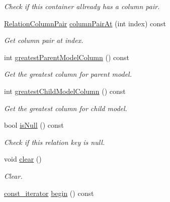 \begin{DoxyCompactItemize}
\begin{DoxyCompactList}\small\item\em Check if this container allready has a column pair. \end{DoxyCompactList}\item 
\hyperlink{class_mdt_1_1_item_model_1_1_relation_column_pair}{Relation\+Column\+Pair} \hyperlink{class_mdt_1_1_item_model_1_1_relation_key_aed3ebac01e8969d0e23df593a96d3486}{column\+Pair\+At} (int index) const 
\begin{DoxyCompactList}\small\item\em Get column pair at index. \end{DoxyCompactList}\item 
int \hyperlink{class_mdt_1_1_item_model_1_1_relation_key_a8ff51a22ed307039ede6e3fbdfc46af3}{greatest\+Parent\+Model\+Column} () const 
\begin{DoxyCompactList}\small\item\em Get the greatest column for parent model. \end{DoxyCompactList}\item 
int \hyperlink{class_mdt_1_1_item_model_1_1_relation_key_ae7d8718603ab7c13be02a49ed34a3818}{greatest\+Child\+Model\+Column} () const 
\begin{DoxyCompactList}\small\item\em Get the greatest column for child model. \end{DoxyCompactList}\item 
bool \hyperlink{class_mdt_1_1_item_model_1_1_relation_key_a2da21411197c2de2771795dba79b896c}{is\+Null} () const \hypertarget{class_mdt_1_1_item_model_1_1_relation_key_a2da21411197c2de2771795dba79b896c}{}\label{class_mdt_1_1_item_model_1_1_relation_key_a2da21411197c2de2771795dba79b896c}

\begin{DoxyCompactList}\small\item\em Check if this relation key is null. \end{DoxyCompactList}\item 
void \hyperlink{class_mdt_1_1_item_model_1_1_relation_key_a875168d781c486249511d18f00ae4655}{clear} ()\hypertarget{class_mdt_1_1_item_model_1_1_relation_key_a875168d781c486249511d18f00ae4655}{}\label{class_mdt_1_1_item_model_1_1_relation_key_a875168d781c486249511d18f00ae4655}

\begin{DoxyCompactList}\small\item\em Clear. \end{DoxyCompactList}\item 
\hyperlink{class_mdt_1_1_item_model_1_1_relation_key_a9f5e75ac5ac158d06a10f1114f9d8b5d}{const\+\_\+iterator} \hyperlink{class_mdt_1_1_item_model_1_1_relation_key_a8041b537cb265d142830bfa73f663962}{begin} () const \hypertarget{class_mdt_1_1_item_model_1_1_relation_key_a8041b537cb265d142830bfa73f663962}{}\label{class_mdt_1_1_item_model_1_1_relation_key_a8041b537cb265d142830bfa73f663962}


\end{DoxyCompactItemize}
